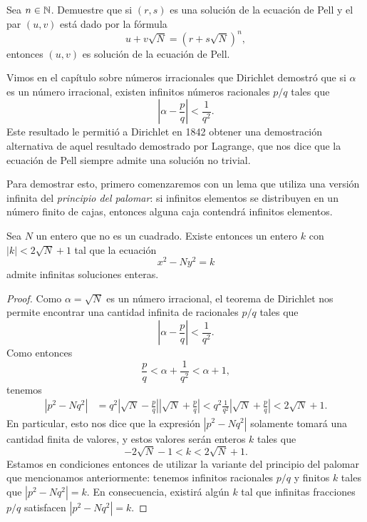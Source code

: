 \begin{exercise}
	Sea $n\in\mathbb{N}$.  Demuestre que si $(r,s)$ es una solución de la ecuación de
	Pell y el par $(u,v)$ está dado por la fórmula 
	\[
		u+v\sqrt{N}=(r+s\sqrt{N})^n,
	\]
	entonces $(u,v)$ es solución de la ecuación de Pell.
\end{exercise}

Vimos en el capítulo sobre números irracionales que Dirichlet demostró que si
$\alpha$ es un número irracional, existen infinitos números racionales $p/q$
tales que
\[
	\left|\alpha-\frac{p}{q}\right|<\frac{1}{q^2}.
\]
Este resultado le permitió a Dirichlet en 1842 obtener una demostración
alternativa de aquel resultado demostrado por Lagrange, que nos dice que la
ecuación de Pell siempre admite una solución no trivial. 

Para demostrar esto, primero comenzaremos con un lema que utiliza una versión
infinita del \emph{principio del palomar}: si infinitos elementos se
distribuyen en un número finito de cajas, entonces alguna caja contendrá
infinitos elementos.

\begin{lemma}
	Sea $N$ un entero que no es un cuadrado.  Existe entonces un entero $k$ con
	$|k|<2\sqrt{N}+1$ tal que la ecuación 
	\[
		x^2-Ny^2=k
	\]
	admite infinitas soluciones enteras. 
\end{lemma}

\begin{proof}
	Como $\alpha=\sqrt{N}$ es un número irracional, el teorema de Dirichlet nos
	permite encontrar una cantidad infinita de racionales $p/q$ tales que
	\[
		\left|\alpha-\frac{p}{q}\right|<\frac{1}{q^2}.
	\]
	Como entonces 
	\[
		\frac{p}{q}<\alpha+\frac{1}{q^{2}}<\alpha+1,
	\]
	tenemos 
	\begin{align*}
		|p^2-Nq^2|&=q^2\left|\sqrt{N}-\frac{p}{q}\right|\left|\sqrt{N}+\frac{p}{q}\right|
		<q^2\frac{1}{q^2}\left|\sqrt{N}+\frac{p}{q}\right|<2\sqrt{N}+1.
	\end{align*}
	En particular, esto nos dice que la expresión $|p^2-Nq^2|$ solamente tomará
	una cantidad finita de valores, y estos valores serán enteros $k$ tales que
	\[
		-2\sqrt{N}-1<k<2\sqrt{N}+1. 
	\]
	Estamos en condiciones entonces de utilizar la variante del principio del
	palomar que mencionamos anteriormente: tenemos infinitos racionales $p/q$ y
	finitos $k$ tales que $|p^2-Nq^2|=k$. En consecuencia, existirá algún $k$
	tal que infinitas fracciones $p/q$ satisfacen $|p^2-Nq^2|=k$.
\end{proof}

